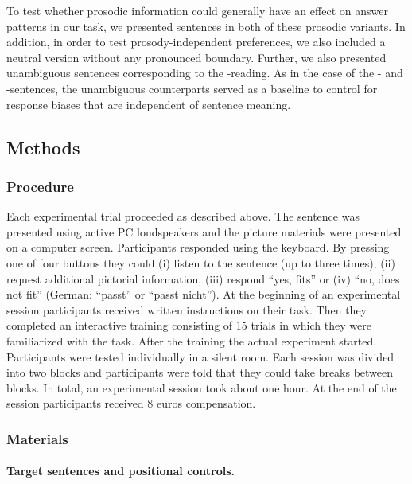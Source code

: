 \documentclass[fleqn,reqno,10pt]{article}
\newcommand{\as}{\acro{as}}
\renewcommand{\es}{\acro{es}}
\newcommand{\ec}{\acro{ec}}
\begin{document}
To test whether prosodic information could generally have an effect on
answer patterns in our task, we presented sentences in both of these
prosodic variants. In addition, in order to test prosody-independent
preferences, we also included a neutral version without any pronounced
boundary. Further, we also presented unambiguous sentences
corresponding to the \ec-reading. As in the case of the \as- and
\es-sentences, the unambiguous counterparts served as a baseline to
control for response biases that are independent of sentence meaning.





\subsection{Methods}
\label{sec:materials}

\subsubsection{Procedure}
\label{sec:procedure} 

Each experimental trial proceeded as described above. The sentence was
presented using active PC loudspeakers and the picture materials were
presented on a computer screen. Participants responded using the
keyboard. By pressing one of four buttons they could (i) listen to the
sentence (up to three times), (ii) request additional pictorial
information, (iii) respond ``yes, fits'' or (iv) ``no, does not fit''
(German: ``passt'' or ``passt nicht''). At the beginning of an
experimental session participants received written instructions on
their task. Then they completed an interactive training consisting of
15 trials in which they were familiarized with the task.  After the
training the actual experiment started. Participants were tested
individually in a silent room. Each session was divided into two
blocks and participants were told that they could take breaks between
blocks. In total, an experimental session took about one hour. At the
end of the session participants received 8 euros compensation.

\subsubsection{Materials}

\paragraph{Target sentences and positional controls.}
\end{document}
